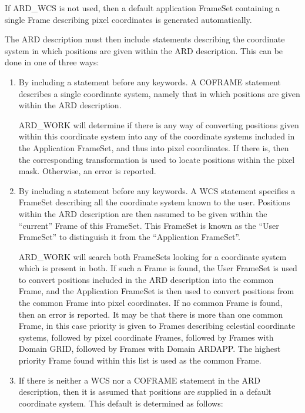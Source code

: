\documentclass[11pt]{starlink}
\begin{document}
If ARD\_WCS is not used, then a default application FrameSet containing a
single Frame describing pixel coordinates is generated automatically.

The ARD description must then include statements describing the
coordinate system in which positions are given within the ARD description.
This can be done in one of three ways:

\begin{enumerate}
\item By including a  statement before any
keywords. A COFRAME statement describes a single coordinate system,
namely that in which positions are given within the ARD description.

ARD\_WORK will determine if there is any way of converting positions
given within this coordinate system into any of the coordinate systems
included in the Application FrameSet, and thus into pixel coordinates.
If there is, then the corresponding transformation is used to locate
positions within the pixel mask. Otherwise, an error is reported.

\item By including a  statement before any
keywords. A WCS statement specifies a FrameSet describing all the
coordinate system known to the user. Positions within the ARD description
are then assumed to be given within the ``current'' Frame of this
FrameSet. This FrameSet is known as the ``User FrameSet'' to distinguish
it from the ``Application FrameSet''.

ARD\_WORK will search both FrameSets looking for a coordinate system
which is present in both. If such a Frame is found, the User FrameSet is
used to convert positions included in the ARD description into the common
Frame, and the Application FrameSet is then used to convert positions
from the common Frame into pixel coordinates. If no common Frame is
found, then an error is reported. It may be that there is more than one
common Frame, in this case priority is given to Frames describing
celestial coordinate systems, followed by pixel coordinate Frames,
followed by Frames with Domain GRID, followed by Frames with Domain
ARDAPP. The highest priority Frame found within this list is used as the
common Frame.

\item If there is neither a WCS nor a COFRAME statement in the ARD
description, then it is assumed that positions are supplied in a default
coordinate system. This default is determined as follows:


\end{enumerate}
\end{document}

